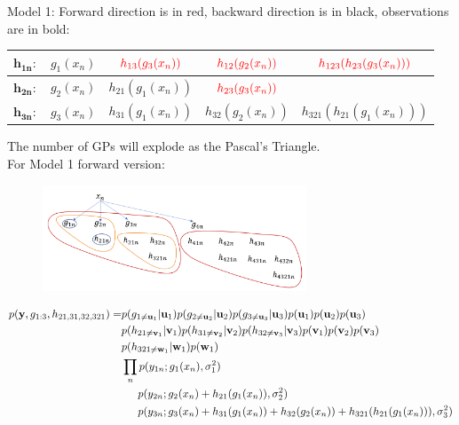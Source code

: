 \documentclass{article}
\begin{document}
Model 1: Forward direction is in red, backward direction is in black, observations are in bold:

\begin{table}[H]
\centering
\begin{tabular}{|c|c|c|c|c|}
	\hline
	$\mathbf{h_{1n}}:$ & $g_1(x_n)$ & $\color{red} h_{13}(g_3(x_n))$ & $\color{red} h_{12}(g_2(x_n))$ & $\color{red} h_{123}(h_{23}(g_3(x_n)))$\\
	\hline
	$\mathbf{h_{2n}}:$ & $g_2(x_n)$ & $h_{21}(g_1(x_n))$ & $\color{red} h_{23}(g_3(x_n))$\\
	\hline
	$\mathbf{h_{3n}}:$ & $g_3(x_n)$ & $h_{31}(g_1(x_n))$ & $h_{32}(g_2(x_n))$ & $ h_{321}(h_{21}(g_1(x_n)))$\\
	\hline
	
\end{tabular}
\end{table}

The number of GPs will explode as the Pascal's Triangle.\\

For Model 1 forward version:

\begin{figure}[H]
\centering
\includegraphics[width=0.7\textwidth]{new2.png}
\end{figure}

\begin{align*}
	p(\mathbf{y},g_{1:3}, h_{21,31,32,321}) = &  p(g_{1\neq\mathbf{u}_1}|\mathbf{u}_1)p(g_{2\neq\mathbf{u}_2}|\mathbf{u}_2)p(g_{3\neq\mathbf{u}_3}|\mathbf{u}_3)p(\mathbf{u}_1)p(\mathbf{u}_2)p(\mathbf{u}_3)\\	
	& p(h_{21\neq\mathbf{v}_1}|\mathbf{v}_1)p(h_{31\neq\mathbf{v}_2}|\mathbf{v}_2)p(h_{32\neq\mathbf{v}_3}|\mathbf{v}_3)p(\mathbf{v}_1)p(\mathbf{v}_2)p(\mathbf{v}_3)\\	
    & p(h_{321\neq\mathbf{w}_1}|\mathbf{w}_1)p(\mathbf{w}_1)\\
    & \prod_n p(y_{1n};g_1(x_n), \sigma^2_1)\\
    & \hspace{1.5em} p(y_{2n};g_2(x_n) + h_{21}(g_1(x_n)), \sigma^2_2)\\
    & \hspace{1.5em} p(y_{3n};g_3(x_n) + h_{31}(g_1(x_n)) + h_{32}(g_2(x_n)) + h_{321}(h_{21}(g_1(x_n))), \sigma^2_3)
\end{align*}
\end{document}
